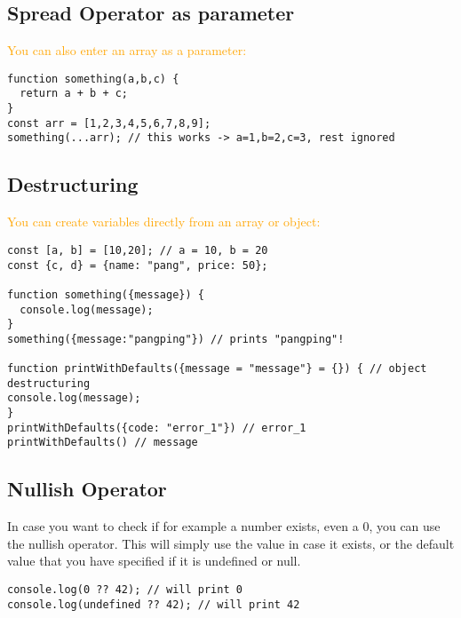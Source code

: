 \documentclass[main.tex,fontsize=6pt,paper=a4,paper=landscape,DIV=calc,]{scrartcl}
\begin{document}
\begin{multicols*}{4}
\subsection{Spread Operator as parameter}  
\textcolor{orange}{You can also enter an array as a parameter:}
\vspace{-2mm}
\begin{lstlisting}
function something(a,b,c) {
  return a + b + c;
}
const arr = [1,2,3,4,5,6,7,8,9];
something(...arr); // this works -> a=1,b=2,c=3, rest ignored
\end{lstlisting}
\vspace{2mm}

\subsection{Destructuring}  
\textcolor{orange}{You can create variables directly from an array or object:}
\vspace{-2mm}
\begin{lstlisting}
const [a, b] = [10,20]; // a = 10, b = 20 
const {c, d} = {name: "pang", price: 50};

function something({message}) {
  console.log(message);
}
something({message:"pangping"}) // prints "pangping"!

function printWithDefaults({message = "message"} = {}) { // object destructuring
console.log(message);
}
printWithDefaults({code: "error_1"}) // error_1
printWithDefaults() // message
\end{lstlisting}
\vspace{2mm}

\subsection{Nullish Operator}  
In case you want to check if for example a number exists, even a 0, you can use the nullish operator.\newline
This will simply use the value in case it exists, or the default value that you have specified if it is undefined or null.
\vspace{-2mm}
\begin{lstlisting}
console.log(0 ?? 42); // will print 0 
console.log(undefined ?? 42); // will print 42
\end{lstlisting}
\vspace{2mm}



\end{multicols*}
\end{document}
